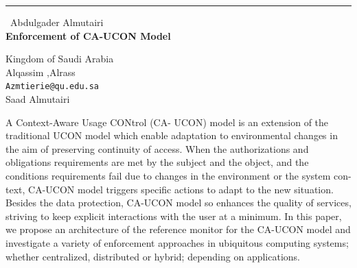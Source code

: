 \documentclass{report}
\begin{document}
\begin{center}
\rule{6in}{1pt} \
{\large Abdulgader Almutairi \\
{\bf Enforcement of CA-UCON Model}}

Kingdom of Saudi Arabia \\ Alqassim ,Alrass
\\
{\tt Azmtierie@qu.edu.sa}\\
Saad Almutairi\end{center}

A Context-Aware Usage CONtrol (CA- UCON) model is an extension of the
traditional UCON model which enable adaptation to environmental changes
in the aim of preserving continuity of access. When the authorizations
and obligations requirements are met by the subject and the object, and
the conditions requirements fail due to changes in the environment or the
system con- text, CA-UCON model triggers specific actions to adapt to the
new situation. Besides the data protection, CA-UCON model so enhances the
quality of services, striving to keep explicit interactions with the user
at a minimum. In this paper, we propose an architecture of the reference
monitor for the CA-UCON model and investigate a variety of enforcement
approaches in ubiquitous computing systems; whether centralized,
distributed or hybrid; depending on applications.
\end{document}
